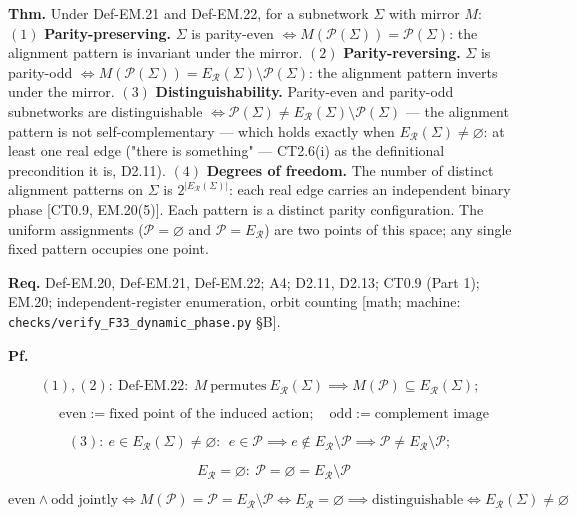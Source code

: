 \begin{theorem}\label{tag:EM-23}
\textbf{Thm.} Under Def-EM.21 and Def-EM.22, for a subnetwork $\Sigma$ with mirror $M$: $(1)$ \textbf{Parity-preserving.} $\Sigma$ is parity-even $\iff M(\mathcal P(\Sigma))=\mathcal P(\Sigma)$: the alignment pattern is invariant under the mirror. $(2)$ \textbf{Parity-reversing.} $\Sigma$ is parity-odd $\iff M(\mathcal P(\Sigma))=E_{\mathcal R}(\Sigma)\setminus\mathcal P(\Sigma)$: the alignment pattern inverts under the mirror. $(3)$ \textbf{Distinguishability.} Parity-even and parity-odd subnetworks are distinguishable $\iff\mathcal P(\Sigma)\ne E_{\mathcal R}(\Sigma)\setminus\mathcal P(\Sigma)$ — the alignment pattern is not self-complementary — which holds exactly when $E_{\mathcal R}(\Sigma)\ne\varnothing$: at least one real edge ("there is something" — CT2.6(i) as the definitional precondition it is, D2.11). $(4)$ \textbf{Degrees of freedom.} The number of distinct alignment patterns on $\Sigma$ is $2^{|E_{\mathcal R}(\Sigma)|}$: each real edge carries an independent binary phase [CT0.9, EM.20(5)]. Each pattern is a distinct parity configuration. The uniform assignments ($\mathcal P=\varnothing$ and $\mathcal P=E_{\mathcal R}$) are two points of this space; any single fixed pattern occupies one point.

\textbf{Req.} Def-EM.20, Def-EM.21, Def-EM.22; A4; D2.11, D2.13; CT0.9 (Part 1); EM.20; independent-register enumeration, orbit counting [math; machine: \texttt{checks/\allowbreak{}verify\_\allowbreak{}F33\_\allowbreak{}dynamic\_\allowbreak{}phase.py} §B].

\textbf{Pf.}

\[
(1),(2):\ \mathrm{Def\text{-}EM.22}:\ M\ \text{permutes}\ E_{\mathcal R}(\Sigma)\implies M(\mathcal P)\subseteq E_{\mathcal R}(\Sigma);
\]

\[
\qquad \text{even}:=\text{fixed point of the induced action};\quad\text{odd}:=\text{complement image}
\]

\[
(3):\ e\in E_{\mathcal R}(\Sigma)\ne\varnothing:\ \ e\in\mathcal P\implies e\notin E_{\mathcal R}\setminus\mathcal P\implies\mathcal P\ne E_{\mathcal R}\setminus\mathcal P;
\]

\[
\qquad E_{\mathcal R}=\varnothing:\ \mathcal P=\varnothing=E_{\mathcal R}\setminus\mathcal P
\]

\[
\text{even}\wedge\text{odd jointly}\iff M(\mathcal P)=\mathcal P=E_{\mathcal R}\setminus\mathcal P\iff E_{\mathcal R}=\varnothing\implies\text{distinguishable}\iff E_{\mathcal R}(\Sigma)\ne\varnothing
\]


\end{theorem}
